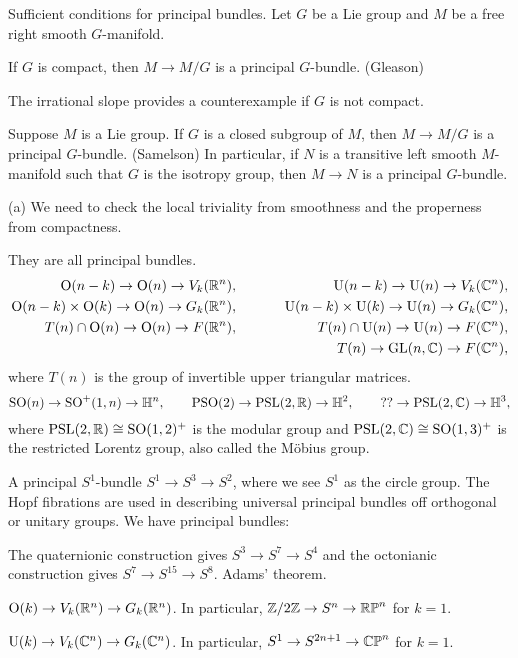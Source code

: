 \documentclass{../../large}
\begin{document}
\begin{prb}
Sufficient conditions for principal bundles.
Let $G$ be a Lie group and $M$ be a free right smooth $G$-manifold.
\begin{parts}
\item If $G$ is compact, then $M\to M/G$ is a principal $G$-bundle. (Gleason)
\item The irrational slope provides a counterexample if $G$ is not compact.
\item Suppose $M$ is a Lie group.
If $G$ is a closed subgroup of $M$, then $M\to M/G$ is a principal $G$-bundle. (Samelson) In particular, if $N$ is a transitive left smooth $M$-manifold such that $G$ is the isotropy group, then $M\to N$ is a principal $G$-bundle.
\end{parts}
\end{prb}
\begin{pf}
(a) We need to check the local triviality from smoothness and the properness from compactness.
\end{pf}

\begin{prb}
They are all principal bundles.
\begin{alignat*}{2}
\mathrm{O}(n-k)\to\mathrm{O}(n)\to V_k(\mathbb{R}^n),&&\qquad\qquad\qquad\mathrm{U}(n-k)\to\mathrm{U}(n)\to V_k(\mathbb{C}^n),&\\
\mathrm{O}(n-k)\times\mathrm{O}(k)\to\mathrm{O}(n)\to G_k(\mathbb{R}^n),&&\mathrm{U}(n-k)\times\mathrm{U}(k)\to\mathrm{U}(n)\to G_k(\mathbb{C}^n),&\\
T(n)\cap\mathrm{O}(n)\to\mathrm{O}(n)\to F(\mathbb{R}^n),&&T(n)\cap\mathrm{U}(n)\to\mathrm{U}(n)\to F(\mathbb{C}^n),&\\
&&T(n)\to\mathrm{GL}(n,\mathbb{C})\to F(\mathbb{C}^n),&
\end{alignat*}
where $T(n)$ is the group of invertible upper triangular matrices.
\[\mathrm{SO}(n)\to\mathrm{SO}^+(1,n)\to\mathbb{H}^n,\qquad\mathrm{PSO}(2)\to\mathrm{PSL}(2,\mathbb{R})\to\mathbb{H}^2,\qquad ??\to\mathrm{PSL}(2,\mathbb{C})\to\mathbb{H}^3,\]
where $\mathrm{PSL}(2,\mathbb{R})\cong\mathrm{SO}(1,2)^+$ is the modular group and $\mathrm{PSL}(2,\mathbb{C})\cong\mathrm{SO}(1,3)^+$ is the restricted Lorentz group, also called the M\"obius group.
\end{prb}

\begin{prb}
A principal $S^1$-bundle $S^1\to S^3\to S^2$, where we see $S^1$ as the circle group.
The Hopf fibrations are used in describing universal principal bundles off orthogonal or unitary groups.
We have principal bundles:
\begin{parts}
\item The quaternionic construction gives $S^3\to S^7\to S^4$ and the octonianic construction gives $S^7\to S^{15}\to S^8$. Adams' theorem.
\item $\mathrm{O}(k)\to V_k(\mathbb{R}^n)\to G_k(\mathbb{R}^n)$. In particular, $\mathbb{Z}/2\mathbb{Z}\to S^n\to\mathbb{RP}^n$ for $k=1$.
\item $\mathrm{U}(k)\to V_k(\mathbb{C}^n)\to G_k(\mathbb{C}^n)$. In particular, $S^1\to S^{2n+1}\to\mathbb{CP}^n$ for $k=1$.
\end{parts}
\end{prb}
\end{document}
